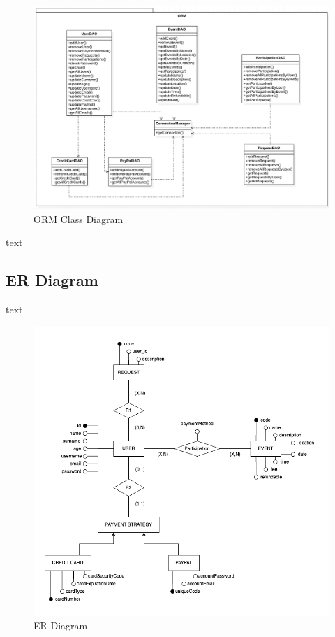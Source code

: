\documentclass[11pt]{article}
\begin{document}
            \begin{figure}[H]
                \centering
                \includegraphics[width=\textwidth]{class_diagram/orm_tmp}
                \caption{ORM Class Diagram}
                \label{fig:orm-class-diagram}
            \end{figure}

            text

        \subsection{ER Diagram} \label{subsec:er-diagram}

            text

            \begin{figure}[H]
                \centering
                \includegraphics[width=\textwidth]{er_diagram/er_diagram}
                \caption{ER Diagram}
                \label{fig:er-diagram}
            \end{figure}
\end{document}
